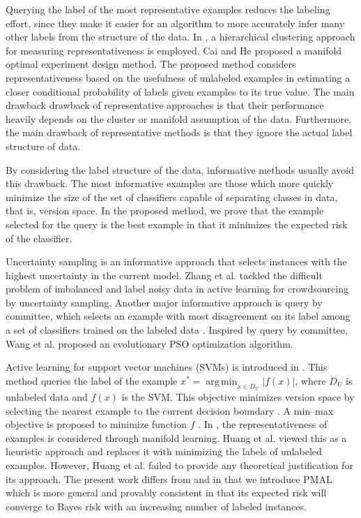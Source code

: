 \documentclass[10pt,twocolumn]{IEEEtran}
\DeclareMathOperator*{\argmin}{arg\,min}
\begin{document}
	Querying the label of the most representative examples reduces the labeling effort, since they make it easier for an algorithm to more accurately infer many other labels from the structure of the data. In \cite{dasgupta2008hierarchical}, a hierarchical clustering approach for measuring representativeness is employed. Cai and He \cite{cai2012manifold} proposed a manifold optimal experiment design method. The proposed method considers representativeness based on the usefulness of unlabeled examples in estimating a closer conditional probability of labels given examples to its true value. The main drawback drawback of representative approaches is that their performance heavily depends on the cluster or manifold assumption of the data. Furthermore, the main drawback of representative methods is that they ignore the actual label structure of data.
	
	By considering the label structure of the data, informative methods usually avoid this drawback. The most informative examples are those which more quickly minimize the size of the set of classifiers capable of separating classes in data, that is, version space. In the proposed method, we prove that the example selected for the query is the best example in that it minimizes the expected risk of the classifier.
	
	Uncertainty sampling \cite{lewis1995sequential} is an informative approach that selects instances with the highest uncertainty in the current model. Zhang et al. \cite{zhang2015active} tackled the difficult problem of imbalanced and label noisy data in active learning for crowdsourcing by uncertainty sampling. Another major informative approach is query by committee, which selects an example with most disagreement on its label among a set of classifiers trained on the labeled data \cite{freund1997selective}. Inspired by query by committee, Wang et al. \cite{wang2017committee} proposed an evolutionary PSO optimization algorithm.
	
	Active learning for support vector machines (SVMs) is introduced in \cite{tong2001support}. This method queries the label of the example $x^* = \argmin_{x \in D_U} |f(x)|$, where $D_U$ is unlabeled data and $f(x)$ is the SVM. This objective minimizes version space by selecting the nearest example to the current decision boundary \cite{tong2001support}. A min--max objective is proposed to minimize function $f$ \cite{hoi2008semi}. In \cite{hoi2008semi}, the representativeness of examples is considered through manifold learning. Huang et al. \cite{huang2014active} viewed this as a heuristic approach and replaces it with minimizing the labels of unlabeled examples. However, Huang et al. \cite{huang2014active} failed to provide any theoretical justification for its approach. The present work differs from \cite{hoi2008semi} and \cite{huang2014active} in that we introduce PMAL which is more general and provably consistent in that its expected risk will converge to Bayes risk with an increasing number of labeled instances.
	
\end{document}
